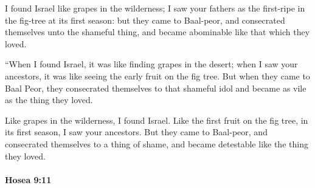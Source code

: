 			\begin{versebox}
					\item[BHS] 
					\item[LXX] 
					\item[ASV] I found Israel like grapes in the wilderness; I saw your fathers as the first-ripe in the fig-tree at its first season: but they came to Baal-peor, and consecrated themselves unto the shameful thing, and became abominable like that which they loved.
					\item[NIV] “When I found Israel, it was like finding grapes in the desert; when I saw your ancestors, it was like seeing the early fruit on the fig tree. But when they came to Baal Peor, they consecrated themselves to that shameful idol and became as vile as the thing they loved.
					\item[NRSV] Like grapes in the wilderness, I found Israel. Like the first fruit on the fig tree, in its first season, I saw your ancestors. But they came to Baal-peor, and consecrated themselves to a thing of shame, and became detestable like the thing they loved.
			\end{versebox}

		\paragraph{Hosea 9:11} %
			\label{HOSEA-9-11}

